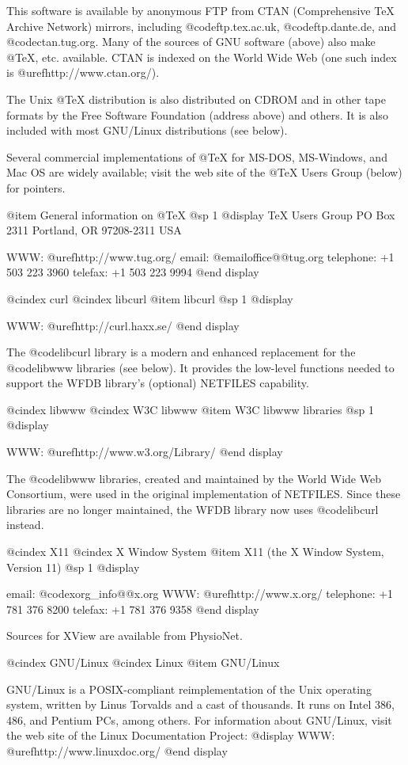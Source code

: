 {{{{{{{{This software is available by anonymous FTP from CTAN (Comprehensive TeX
Archive Network) mirrors, including @code{ftp.tex.ac.uk}, @code{ftp.dante.de},
and @code{ctan.tug.org}.  Many of the sources of GNU software (above) also make
@TeX{}, etc. available.  CTAN is indexed on the World Wide Web (one such index
is @uref{http://www.ctan.org/}).

The Unix @TeX{} distribution is also distributed on CDROM and in other tape
formats by the Free Software Foundation (address above) and others.  It is
also included with most GNU/Linux distributions (see below).

Several commercial implementations of @TeX{} for MS-DOS, MS-Windows, and Mac OS
are widely available;  visit the web site of the @TeX{} Users Group (below) for
pointers.

@item General information on @TeX{}
@sp 1
@display
TeX Users Group
PO Box 2311
Portland, OR 97208-2311 USA

WWW: @uref{http://www.tug.org/}
email: @email{office@@tug.org}
telephone: +1 503 223 3960
telefax: +1 503 223 9994
@end display

@cindex curl
@cindex libcurl
@item libcurl
@sp 1
@display

WWW: @uref{http://curl.haxx.se/}
@end display

The @code{libcurl} library is a modern and enhanced replacement for the
@code{libwww} libraries (see below).  It provides the low-level functions needed
to support the WFDB library's (optional) NETFILES capability.

@cindex libwww
@cindex W3C libwww
@item W3C libwww libraries
@sp 1
@display

WWW: @uref{http://www.w3.org/Library/}
@end display

The @code{libwww} libraries, created and maintained by the World Wide Web
Consortium, were used in the original implementation of NETFILES.  Since these
libraries are no longer maintained, the WFDB library now uses @code{libcurl}
instead.

@cindex X11
@cindex X Window System
@item X11 (the X Window System, Version 11)
@sp 1
@display

email: @code{xorg_info@@x.org}
WWW: @uref{http://www.x.org/}
telephone: +1 781 376 8200
telefax: +1 781 376 9358
@end display

Sources for XView are available from PhysioNet.

@cindex GNU/Linux
@cindex Linux
@item GNU/Linux

GNU/Linux is a POSIX-compliant reimplementation of the Unix operating system,
written by Linus Torvalds and a cast of thousands.  It runs on Intel 386,
486, and Pentium PCs, among others.  For information about GNU/Linux, visit
the web site of the Linux Documentation Project:
@display
WWW: @uref{http://www.linuxdoc.org/}
@end display

}}}}}}}}
